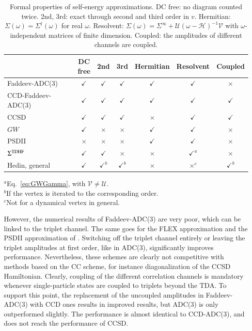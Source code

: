 \documentclass[aip,jcp,reprint,noshowkeys,superscriptaddress]{revtex4-1}
\begin{document}
\begin{table}[hbt!]
\caption{Formal properties of self-energy approximations.
DC free: no diagram counted twice.
2nd, 3rd: exact through second and third order in $v$.
Hermitian: $\Sigma(\omega)=\Sigma^\dagger(\omega)$ for real $\omega$.
Resolvent: $\Sigma(\omega)=\Sigma^{\infty}+\mathcal U(\omega-\mathcal H)^{-1}\mathcal V$
with $\omega$-independent matrices of finite dimension.
Coupled: the amplitudes of different channels are coupled.}
\label{tab:properties}
\footnotesize
\begin{tabular}{lcccccc}
\toprule
 & \makecell{DC\\free} & 2nd & 3rd & Hermitian & Resolvent & Coupled \\
\midrule
Faddeev-ADC(3) & $\checkmark$ & $\checkmark$ & $\checkmark$ & $\checkmark$ & $\checkmark$ & $\times$ \\
CCD-Faddeev-ADC(3) & $\checkmark$ & $\checkmark$ & $\checkmark$ & $\checkmark$ & $\checkmark$ & $\checkmark$ \\
CCSD & $\checkmark$ & $\checkmark$ & $\checkmark$ & $\times$ & $\checkmark$ & $\checkmark$ \\
$GW$ & $\checkmark$ & $\times$ & $\times$ & $\checkmark$ & $\checkmark$ & $\times$ \\
PSDII & $\times$ & $\times$ & $\times$ & $\checkmark$ & $\checkmark$ & $\times$ \\
$\Sigma^{\rm TDHF}$ & $\checkmark$ & $\checkmark$ & $\times$ & $\times$ & $\checkmark^{a}$ & $\times$ \\
Hedin, general & $\checkmark$ & $\checkmark^{b}$ & $\checkmark^{b}$ & $\times$ & $\times^{c}$ & $\checkmark^{b}$ \\
\bottomrule
\end{tabular}
\par\smallskip
{\raggedright\footnotesize
$^{a}$Eq.~\eqref{eq:GWGamma}, with $\mathcal V\neq\mathcal U$.\\
$^{b}$If the vertex is iterated to the corresponding order.\\
$^{c}$Not for a dynamical vertex in general.\par}
\end{table}

However, the numerical
results of Faddeev-ADC(3) are very poor, which can be linked to 
the triplet channel. The same goes for the FLEX approximation
and the PSDII approximation of \citet{Pavlyukh2026}. Switching 
off the triplet channel entirely or leaving the triplet amplitudes 
at first order, like in ADC(3), significantly improves performance.
Nevertheless, these schemes are clearly not competitive with 
methods based on the CC scheme, for instance diagonalization of the 
CCSD Hamiltonian. Clearly, coupling of the different correlation 
channels is mandatory whenever single-particle states are coupled to 
triplets beyond the TDA. To support this point, the replacement of the 
uncoupled amplitudes in Faddeev-ADC(3) with CCD ones results in improved 
results, but ADC(3) is only outperformed slightly. The performance is 
almost identical to CCD-ADC(3), and does not reach the performance of CCSD.
\end{document}
